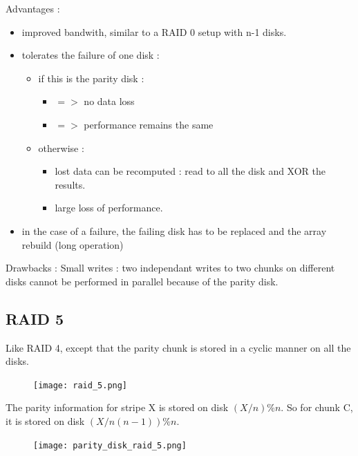 \documentclass[a4paper,10pt]{report}
\newlength{\larg}
\begin{document}
Advantages :

\begin{itemize}
  \item improved bandwith, similar to a RAID 0 setup with n-1 disks.
  \item tolerates the failure of one disk :
  \begin{itemize}
    \item if this is the parity disk :
    \begin{itemize}
      \item $=>$ no data loss
      \item $=>$ performance remains the same
    \end{itemize}
    \item otherwise :
    \begin{itemize}
      \item lost data can be recomputed : read to all the disk and XOR the results.
      \item large loss of performance.
    \end{itemize}
  \end{itemize}
  \item in the case of a failure, the failing disk has to be replaced and the array rebuild (long operation)
\end{itemize}

Drawbacks :
Small writes : two independant writes to two chunks on different disks cannot be performed in parallel because of the parity disk.

\subsection{RAID 5}

Like RAID 4, except that the parity chunk is stored in a cyclic manner on all the disks.

\begin{figure}[h!]
  \begin{center}
    \texttt{[image: raid\_5.png]}
    \caption{}
  \end{center}
\end{figure}

The parity information for stripe X is stored on disk $(X/n)\%n$.
So for chunk C, it is stored on disk $(X/n(n-1))\%n$.

\begin{figure}[h!]
  \begin{center}
    \texttt{[image: parity\_disk\_raid\_5.png]}
    \caption{}
  \end{center}
\end{figure}
\end{document}
